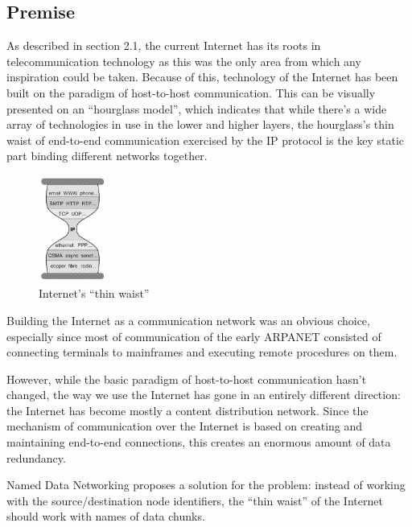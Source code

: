         \subsection{Premise}
            As described in section 2.1, the current Internet has its roots in telecommunication technology as this was the only area from which any inspiration could be taken. Because of this, technology of the Internet has been built on the paradigm of host-to-host communication. This can be visually presented on an ``hourglass model'', which indicates that while there's a wide array of technologies in use in the lower and higher layers, the hourglass's thin waist of end-to-end communication exercised by the IP protocol is the key static part binding different networks together.

            \begin{figure}[H]
                \begin{center}
                    \includegraphics[width=0.2\textwidth]{fig/ndn_hourglass1.jpg}
                  \caption{Internet's ``thin waist''}
                  \label{ndn-hourglass1}
                \end{center}
            \end{figure}


            Building the Internet as a communication network was an obvious choice, especially since most of communication of the early ARPANET consisted of connecting terminals to mainframes and executing remote procedures on them.

            However, while the basic paradigm of host-to-host communication hasn't changed, the way we use the Internet has gone in an entirely different direction: the Internet has become mostly a content distribution network. Since the mechanism of communication over the Internet is based on creating and maintaining end-to-end connections, this creates an enormous amount of data redundancy.

            Named Data Networking proposes a solution for the problem: instead of working with the source/destination node identifiers, the ``thin waist'' of the Internet should work with names of data chunks.

